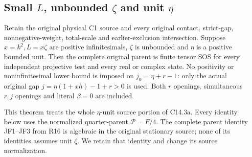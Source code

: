 \subsection{Small $L$, unbounded $\zeta$ and unit $\eta$}

\label{component:p60eca5442075}

\label{p60eca5442075:sec:r17-lz-unit-eta}

\begin{theorem}
Retain the original physical C1 source and every original contact,
strict-gap, nonnegative-weight, total-scale and earlier-exclusion
intersection. Suppose $x=k^2,L=x\zeta$ are positive infinitesimals,
$\zeta$ is unbounded and $\eta$ is a positive bounded unit.
Then the complete original parent is finite tensor SOS for every
independent projective test and every real or complex state.
No positivity or noninfinitesimal lower bound is imposed on
$j_0=\eta+r-1$: only the actual original gap
$j=\eta(1+xh)-1+r>0$ is used. Both $r$ openings, simultaneous
$r,j$ openings and literal $\beta=0$ are included.
\end{theorem}

This theorem treats the whole $\eta$-unit source portion of C14.3a.
Every identity below uses the normalized quarter-parent $\mathcal P=F/4$.
The complete parent identity JF1--JF3 from R16 is algebraic in the
original stationary source; none of its identities assumes unit
$\zeta$. We retain that identity and change its source normalization.

